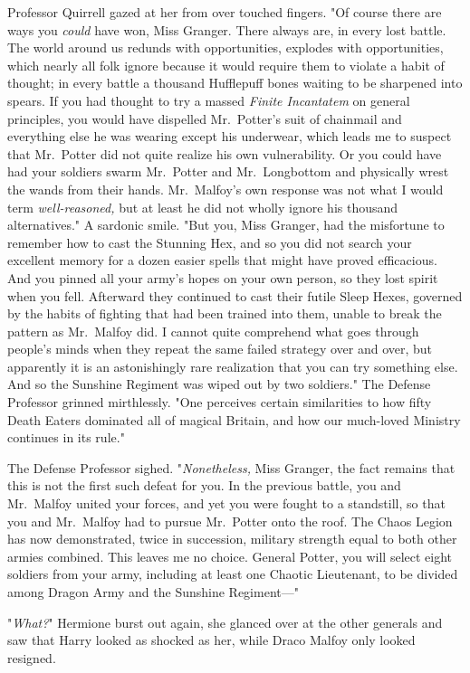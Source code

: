 Professor Quirrell gazed at her from over touched fingers. "Of course there are
ways you \emph{could} have won, Miss Granger. There always are, in every lost
battle. The world around us redunds with opportunities, explodes with
opportunities, which nearly all folk ignore because it would require them to
violate a habit of thought; in every battle a thousand Hufflepuff bones waiting
to be sharpened into spears. If you had thought to try a massed \emph{Finite
Incantatem} on general principles, you would have dispelled Mr.~Potter's suit
of chainmail and everything else he was wearing except his underwear, which
leads me to suspect that Mr.~Potter did not quite realize his own
vulnerability. Or you could have had your soldiers swarm Mr.~Potter and
Mr.~Longbottom and physically wrest the wands from their hands. Mr.~Malfoy's
own response was not what I would term \emph{well-reasoned,} but at least he
did not wholly ignore his thousand alternatives." A sardonic smile. "But you,
Miss Granger, had the misfortune to remember how to cast the Stunning Hex, and
so you did not search your excellent memory for a dozen easier spells that
might have proved efficacious. And you pinned all your army's hopes on your own
person, so they lost spirit when you fell. Afterward they continued to cast
their futile Sleep Hexes, governed by the habits of fighting that had been
trained into them, unable to break the pattern as Mr.~Malfoy did. I cannot
quite comprehend what goes through people's minds when they repeat the same
failed strategy over and over, but apparently it is an astonishingly rare
realization that you can try something else. And so the Sunshine Regiment was
wiped out by two soldiers." The Defense Professor grinned mirthlessly. "One
perceives certain similarities to how fifty Death Eaters dominated all of
magical Britain, and how our much-loved Ministry continues in its rule."

The Defense Professor sighed. "\emph{Nonetheless,} Miss Granger, the fact
remains that this is not the first such defeat for you. In the previous battle,
you and Mr.~Malfoy united your forces, and yet you were fought to a standstill,
so that you and Mr.~Malfoy had to pursue Mr.~Potter onto the roof. The Chaos
Legion has now demonstrated, twice in succession, military strength equal to
both other armies combined. This leaves me no choice. General Potter, you will
select eight soldiers from your army, including at least one Chaotic
Lieutenant, to be divided among Dragon Army and the Sunshine Regiment---"

"\emph{What?}" Hermione burst out again, she glanced over at the other generals
and saw that Harry looked as shocked as her, while Draco Malfoy only looked
resigned.

